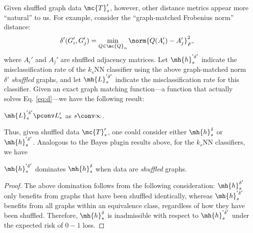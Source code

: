 \documentclass[10pt,journal,cspaper,compsoc]{IEEEtran}
\begin{document}
Given shuffled graph data $\mc{T}_s'$, however, other distance metrics appear more ``natural'' to us.  For example,  
consider the ``graph-matched Frobenius norm'' distance:
\begin{align} \label{eq:d}
\delta'(G_i',G_j')=\min_{Q \in \mc{Q}_n}\norm{Q(A_i')-A_j'}_F^2,	
\end{align}
where $A_i'$ and $A_j'$ are shuffled adjacency matrices.  
Let $\mh{h}^{'\delta'}_s$ indicate the misclassification rate of the $k_s$NN classifier using the above graph-matched norm $\delta'$ \emph{shuffled} graphs, and let $\mh{L}^{'\delta'}_s$ indicate the misclassification rate for this classifier.  Given an exact graph matching function---a function that actually solves Eq. \eqref{eq:d}---we have the following result:
\begin{coro} \label{cor:Sh_knn}
	$\mh{L}^{'\delta'}_s \pconv L_*'$ as $s \conv \infty$.
\end{coro}
Thus, given shuffled data $\mc{T}_s'$, one could consider either $\mh{h}_s^{\delta}$ or $\mh{h}_s^{'\delta'}$.  Analogous to the Bayes plugin results above, for the $k_s$NN classifiers, we have 
\begin{thm} \label{thm:knninadmiss}
	$\mh{h}_s^{'\delta'}$ dominates $\mh{h}_s^{\delta}$ when data are \emph{shuffled} graphs.
\end{thm}
\begin{proof}
	The above domination follows from the following consideration:  
	$\mh{h}_s^{\delta'}$ only benefits from graphs that have been shuffled identically, whereas $\mh{h}_s^{'\delta'}$  benefits from all graphs within an equivalence class, regardless of how they have been shuffled. Therefore, $\mh{h}^{\delta}_s$ is inadmissible with respect to $\mh{h}_s^{'\delta'}$ under the expected risk of $0-1$ loss. \end{proof}
\end{document}
